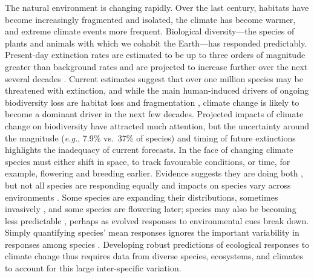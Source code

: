 \documentclass[12pt]{report}
\begin{document}
The natural environment is changing rapidly. Over the last century,
habitats have become increasingly fragmented and
isolated\supercite{Haddad2015}, the climate has become warmer, and
extreme climate events more frequent\supercite{IPCC2014}. Biological
diversity---the species of plants and animals with which we cohabit
the Earth---has responded predictably. Present-day extinction rates
are estimated to be up to three orders of magnitude greater than
background rates \supercite{Pimm2014} and are projected to increase
further over the next several decades \supercite{MEA2005}. Current
estimates suggest that over one million species may be threatened with
extinction\supercite{IPBESland2019}, and while the main human-induced
drivers of ongoing biodiversity loss are habitat loss
\supercite{Newbold2015} and fragmentation \supercite{Haddad2015},
climate change is likely to become a dominant driver in the next few
decades\supercite{Parmesan2003,Thuiller2007,Urban2015}. Projected
impacts of climate change on biodiversity have attracted much
attention, but the uncertainty around the magnitude (\emph{e.g.},
7.9\%\supercite{Urban2015} vs.\ 37\%\supercite{Thomas2004} of species)
and timing \supercite{Trisos2020} of future extinctions highlights the
inadequacy of current forecasts.  In the face of changing climate
species must either shift in space, to track favourable conditions, or
time, for example, flowering and breeding earlier.
Evidence suggests they are doing both
\supercite{Parmesan2003,Parmesan2006,Menzel2006,Chen2011}, but not all
species are responding equally and impacts on species vary across
environments \supercite{Pinsky2019}. Some species are expanding their
distributions, sometimes invasively \supercite{Hellmann2008}, and some
species are flowering later\supercite{Cook2012}; species may also be
becoming less predictable \supercite{Pearse2017phenology},
perhaps as evolved responses to environmental cues break down.  Simply
quantifying species' mean responses ignores the important variability
in responses among species \supercite{Wolkovich2012}. Developing
robust predictions of ecological responses to climate change thus
requires data from diverse species, ecosystems, and climates to
account for this large inter-specific variation.
\end{document}
